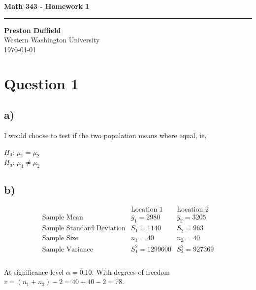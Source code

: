 \documentclass{article}
\begin{document}
\noindent
\begin{minipage}[t]{0.6\textwidth}
    \begin{flushleft}
        \LARGE\textbf{Math 343 - Homework 1} \\
        \vspace{6pt} %
        \hrule width 10cm
        \vspace{12pt}
        \large\textbf{Preston Duffield} \\
        \large Western Washington University \\
        \today
        \vspace{24pt}
    \end{flushleft}
\end{minipage}


\section*{Question 1}

\subsection*{a)}
I would choose to test if the two population means where equal, ie,
\begin{flushleft}
    $H_0$: $\mu_1 = \mu_2$ \\
    $H_a$: $\mu_1 \neq \mu_2$ \\
\end{flushleft}
\subsection*{b)}
\begin{equation*}
    \begin{array}{c|c|c}
        & \text{Location 1} & \text{Location 2} \\
        \hline
        \text{Sample Mean} & \bar{y}_1 = 2980 & \bar{y}_2 = 3205 \\
        \text{Sample Standard Deviation} & S_1 = 1140 & S_2 = 963 \\
        \text{Sample Size} & n_1 = 40 & n_2 = 40 \\
        \text{Sample Variance} & S_1^2 = 1299600 & S_2^2 = 927369 \\
    \end{array}
\end{equation*}\\

At significance level $\alpha = 0.10$. With degrees of freedom $v = (n_1 + n_2) - 2 = 40 + 40 - 2 = 78$.
\end{document}
